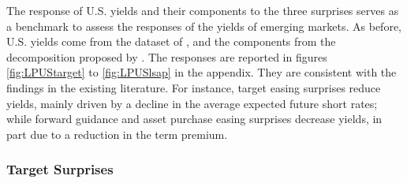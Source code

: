 {The response of U.S. yields and their components to the three surprises serves as a benchmark to assess the responses of the yields of emerging markets. 
As before, U.S. yields come from the dataset of \cite{GSW:2007}, and the components from the decomposition proposed by \cite{KimWright:2005}.
The responses are reported in figures \ref{fig:LPUStarget} to \ref{fig:LPUSlsap} in the appendix. 
They are consistent with the findings in the existing literature.
For instance, target easing surprises reduce yields, mainly driven by a decline in the average expected future short rates;
while forward guidance and asset purchase easing surprises decrease yields, in part due to a reduction in the term premium.


\subsubsection{Target Surprises}
\iftoggle{toclinks}{\gototoc}{} %

}
